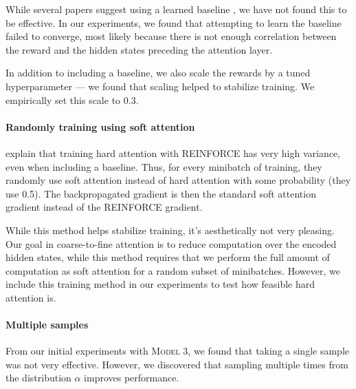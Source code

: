 \documentclass[12pt]{report}
\begin{document}
While several papers suggest using a learned baseline \citep[e.g.][]{mnih2014visualattention, ranzato2015}, we have not found this to be effective. In our experiments, we found that attempting to learn the baseline failed to converge, most likely because there is not enough correlation between the reward and the hidden states preceding the attention layer.

In addition to including a baseline, we also scale the rewards by a tuned hyperparameter --- we found that scaling helped to stabilize training. We empirically set this scale to 0.3.







\paragraph{Randomly training using soft attention} \citet{xu2015captioning} explain that training hard attention with REINFORCE has very high variance, even when including a baseline. Thus, for every minibatch of training, they randomly use soft attention instead of hard attention with some probability (they use 0.5).
The backpropagated gradient is then the standard soft attention gradient instead of the REINFORCE gradient.

While this method helps stabilize training, it's aesthetically not very pleasing. Our goal in coarse-to-fine attention is to reduce computation over the encoded hidden states, while this method requires that we perform the full amount of computation as soft attention for a random subset of minibatches. However, we include this training method in our experiments to test how feasible hard attention is.


\paragraph{Multiple samples} 
From our initial experiments with \textsc{Model 3}, we found that taking a single sample was not very effective. However, we discovered that sampling multiple times from the distribution $\alpha$ improves performance.
\end{document}
